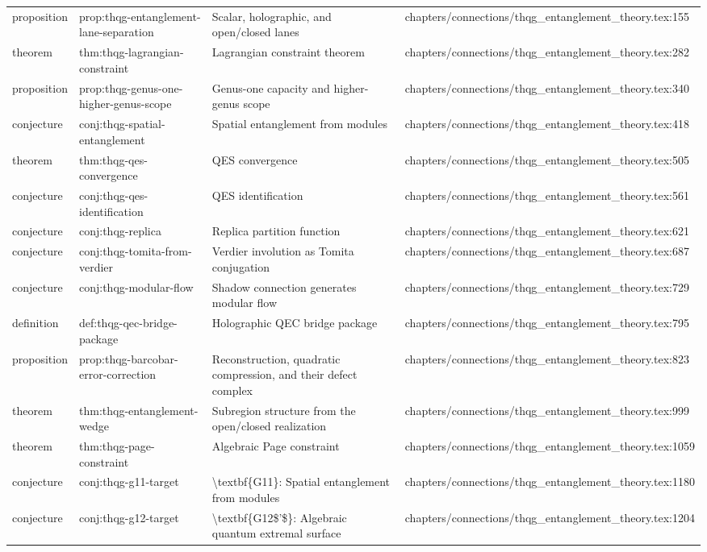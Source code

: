 \documentclass[11pt]{article}
\begin{document}
\begin{longtable}{L{0.10\textwidth}L{0.26\textwidth}L{0.42\textwidth}L{0.22\textwidth}}
proposition & prop:thqg-entanglement-lane-separation & Scalar, holographic, and op{}en/closed lanes & chapters/connections/thqg\_entanglement\_theory.tex:155\\
theorem & thm:thqg-lagrangian-constraint & Lagrangian constraint theorem & chapters/connections/thqg\_entanglement\_theory.tex:282\\
proposition & prop:thqg-genus-one-higher-genus-scope & Genus-one capacity and higher-genus scope & chapters/connections/thqg\_entanglement\_theory.tex:340\\
conjecture & conj:thqg-spatial-entanglement & Spatial entanglement from modules & chapters/connections/thqg\_entanglement\_theory.tex:418\\
theorem & thm:thqg-qes-convergence & QES convergence & chapters/connections/thqg\_entanglement\_theory.tex:505\\
conjecture & conj:thqg-qes-identification & QES identification & chapters/connections/thqg\_entanglement\_theory.tex:561\\
conjecture & conj:thqg-replica & Replica partition function & chapters/connections/thqg\_entanglement\_theory.tex:621\\
conjecture & conj:thqg-tomita-from-verdier & Verdier involution as Tomita conjugation & chapters/connections/thqg\_entanglement\_theory.tex:687\\
conjecture & conj:thqg-modular-flow & Shadow connection generates modular flow & chapters/connections/thqg\_entanglement\_theory.tex:729\\
definition & def:thqg-qec-bridge-package & Holographic QEC bridge package & chapters/connections/thqg\_entanglement\_theory.tex:795\\
proposition & prop:thqg-barcobar-error-correction & Reconstruction, quadratic compression, and their defect complex & chapters/connections/thqg\_entanglement\_theory.tex:823\\
theorem & thm:thqg-entanglement-wedge & Subregion structure from the op{}en/closed realization & chapters/connections/thqg\_entanglement\_theory.tex:999\\
theorem & thm:thqg-page-constraint & Algebraic Page constraint & chapters/connections/thqg\_entanglement\_theory.tex:1059\\
conjecture & conj:thqg-g11-target & \textbackslash{}textbf\{G11\}: Spatial entanglement from modules & chapters/connections/thqg\_entanglement\_theory.tex:1180\\
conjecture & conj:thqg-g12-target & \textbackslash{}textbf\{G12\$'\$\}: Algebraic quantum extremal surface & chapters/connections/thqg\_entanglement\_theory.tex:1204\\

\end{longtable}
\end{document}
